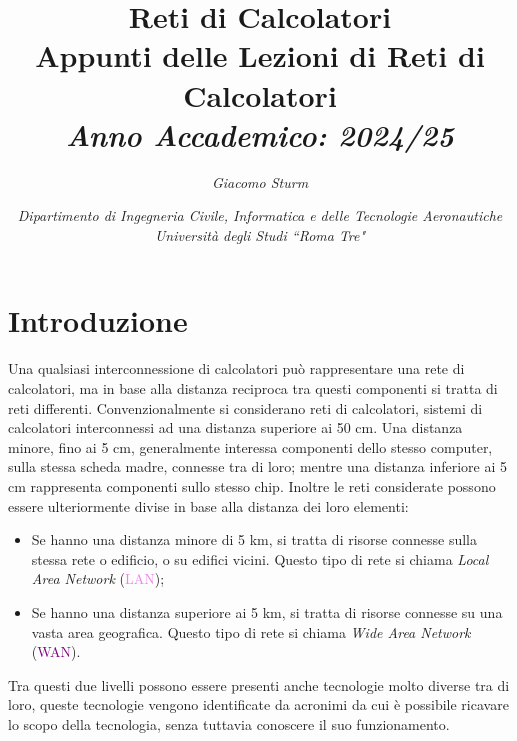\documentclass{article}
\numberwithin{equation}{subsection}
\begin{document}
\title{%
    \textbf{Reti di Calcolatori}  \\ 
    \large Appunti delle Lezioni di Reti di Calcolatori \\
    \textit{Anno Accademico: 2024/25}}
\author{\textit{Giacomo Sturm}}
\date{\textit{Dipartimento di Ingegneria Civile, Informatica e delle Tecnologie Aeronautiche \\
Università degli Studi ``Roma Tre"}}

\maketitle
\thispagestyle{link}
\clearpage


\pagestyle{fancy}
\fancyhead{}\fancyfoot{}
\fancyfoot[C]{\thepage}

\tableofcontents


\clearpage
{}



\section{Introduzione}

Una qualsiasi interconnessione di calcolatori può rappresentare una rete di calcolatori, ma in base alla distanza reciproca tra questi componenti 
si tratta di reti differenti. Convenzionalmente si considerano reti di calcolatori, sistemi di calcolatori interconnessi ad una distanza 
superiore ai 50 cm. Una distanza minore, fino ai 5 cm, generalmente interessa componenti dello stesso computer, sulla stessa scheda madre, connesse tra di loro; mentre una 
distanza inferiore ai 5 cm rappresenta componenti sullo stesso chip. Inoltre le reti considerate possono essere ulteriormente divise in base 
alla distanza dei loro elementi:
\begin{itemize}
    \item Se hanno una distanza minore di 5 km, si tratta di risorse connesse sulla stessa rete o edificio, o su edifici vicini. Questo tipo di rete si chiama \textit{Local Area Network} (\textcolor{violet}{LAN});
    \item Se hanno una distanza superiore ai 5 km, si tratta di risorse connesse su una vasta area geografica. Questo tipo di rete si chiama \textit{Wide Area Network} (\textcolor{purple}{WAN}).
\end{itemize}
Tra questi due livelli possono essere presenti anche tecnologie molto diverse tra di loro, queste tecnologie vengono identificate da acronimi da cui 
è possibile ricavare lo scopo della tecnologia, senza tuttavia conoscere il suo funzionamento. 
\end{document}
